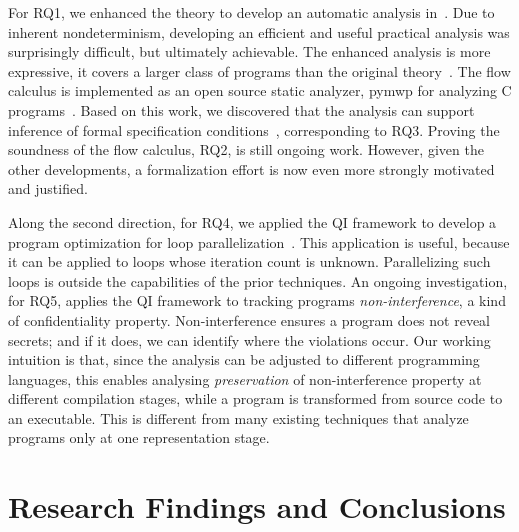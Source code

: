 For RQ1, we enhanced the theory to develop an automatic analysis in~\cite{aubert20222,aubert2023b,rusch2025}.
Due to inherent nondeterminism, developing an efficient and useful practical analysis was surprisingly difficult, but ultimately achievable.
The enhanced analysis is more expressive,
\ie it covers a larger class of programs than the original theory~\cite{rusch2025}.
The flow calculus is implemented as an open source static analyzer, pymwp%
for analyzing C programs~\cite{aubert2023b}.
Based on this work, we discovered that the analysis can support
inference of formal specification conditions~\cite{rusch2025}, corresponding to RQ3.
Proving the soundness of the flow calculus, RQ2, is still ongoing work.
However, given the other developments, a formalization effort is now even more strongly motivated and justified.

Along the second direction, for RQ4, we applied the QI framework to develop a program optimization for loop parallelization~\cite{aubert20232}.
This application is useful, because it can be applied to loops whose iteration count is unknown.
Parallelizing such loops is outside the capabilities of the prior techniques.
An ongoing investigation, for RQ5, applies the QI framework to tracking programs \emph{non\hyp{}interference}, a kind of confidentiality property.
Non-interference ensures a program does not reveal secrets;
and if it does, we can identify where the violations occur.
Our working intuition is that, since the analysis can be adjusted to different programming languages,
this enables analysing \emph{preservation} of non-interference property at different compilation stages,
while a program is transformed from source code to an executable.
This is different from many existing techniques that analyze programs only at one representation stage.

\section{Research Findings and Conclusions}
\label{aicc-discussion}


